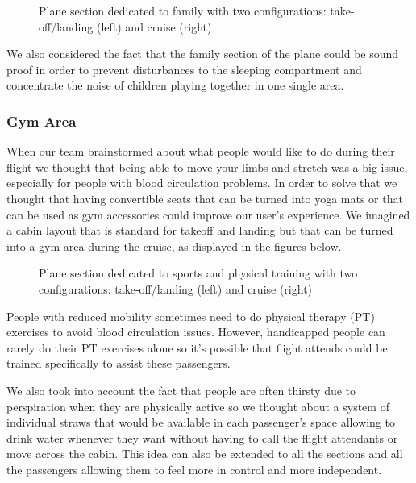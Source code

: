 \begin{figure}[h]
  \centering
   \caption{Plane section dedicated to family with two configurations: take-off/landing (left) and cruise (right)}
  \label{fig:PHOTO ROBBIE}
\end{figure}

We also considered the fact that the family section of the plane could be sound proof in order to prevent disturbances to the sleeping compartment and concentrate the noise of children playing together in one single area.

\subsubsection{Gym Area}
When our team brainstormed about what people would like to do during their flight we thought that being able to move your limbs and stretch was a big issue, especially for people with blood circulation problems. In order to solve that we thought that having convertible seats that can be turned into yoga mats or that can be used as gym accessories could improve our user’s experience. We imagined a cabin layout that is standard for takeoff and landing but that can be turned into a gym area during the cruise, as displayed in the figures below. \\

\begin{figure}[h]
  \centering
   \caption{Plane section dedicated to sports and physical training with two configurations: take-off/landing (left) and cruise (right)}
  \label{fig:PHOTO ROBBIE}
\end{figure}

People with reduced mobility sometimes need to do physical therapy (PT) exercises to avoid blood circulation issues. However, handicapped people can rarely do their PT exercises alone so it’s possible that flight attends could be trained specifically to assist these passengers.

We also took into account the fact that people are often thirsty due to perspiration when they are physically active so we thought about a system of individual straws that would be available in each passenger’s space allowing to drink water whenever they want without having to call the flight attendants or move across the cabin. This idea can also be extended to all the sections and all the passengers allowing them to feel more in control and more independent.

